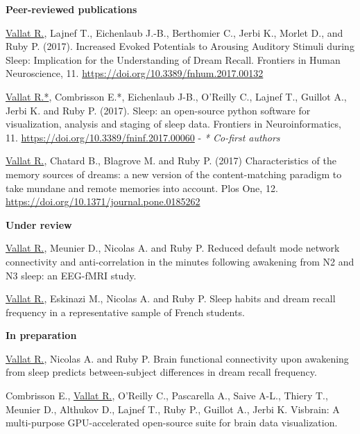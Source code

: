 \label{sec:publications}
\vspace*{-10mm}

\textbf{Peer-reviewed publications}

\underline{Vallat R.}, Lajnef T., Eichenlaub J.-B., Berthomier C., Jerbi K., Morlet D., and Ruby P. (2017). Increased Evoked Potentials to Arousing Auditory Stimuli during Sleep: Implication for the Understanding of Dream Recall. Frontiers in Human Neuroscience, 11. \url{https://doi.org/10.3389/fnhum.2017.00132}

\underline{Vallat R.*}, Combrisson E.*, Eichenlaub J-B., O'Reilly C., Lajnef T., Guillot A., Jerbi K. and Ruby P. (2017). Sleep: an open-source python software for visualization, analysis and staging of sleep data. Frontiers in Neuroinformatics, 11. \url{https://doi.org/10.3389/fninf.2017.00060} - \emph{* Co-first authors}

\underline{Vallat R.}, Chatard B., Blagrove M. and Ruby P. (2017) Characteristics of the memory sources of dreams: a new version
of the content-matching paradigm to take mundane and remote memories into account. Plos One, 12. \url{https://doi.org/10.1371/journal.pone.0185262}

\textbf{Under review}

\underline{Vallat R.}, Meunier D., Nicolas A. and Ruby P. Reduced default mode network connectivity and anti-correlation in the minutes following awakening from N2 and N3 sleep: an EEG-fMRI study.

\underline{Vallat R.}, Eskinazi M., Nicolas A. and Ruby P. Sleep habits and dream recall frequency in a representative sample
of French students.

\textbf{In preparation}

\underline{Vallat R.}, Nicolas A. and Ruby P. Brain functional connectivity upon awakening from sleep predicts between-subject differences in dream recall frequency.

Combrisson E., \underline{Vallat R.}, O'Reilly C., Pascarella A., Saive A-L., Thiery T., Meunier D., Althukov D., Lajnef T., Ruby P., Guillot A., Jerbi K. Visbrain: A multi-purpose GPU-accelerated open-source suite for brain data visualization.

